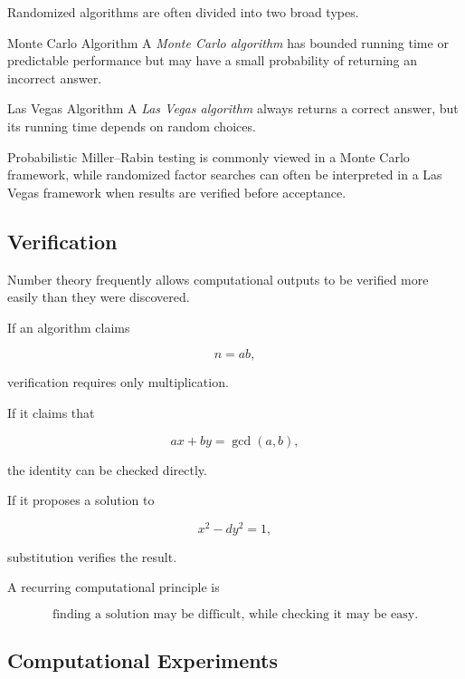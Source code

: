 Randomized algorithms are often divided into two broad types.

\begin{definitionbox}{Monte Carlo Algorithm}
A \emph{Monte Carlo algorithm} has bounded running time or predictable
performance but may have a small probability of returning an incorrect
answer.
\end{definitionbox}

\begin{definitionbox}{Las Vegas Algorithm}
A \emph{Las Vegas algorithm} always returns a correct answer, but its running
time depends on random choices.
\end{definitionbox}

Probabilistic Miller--Rabin testing is commonly viewed in a Monte Carlo
framework, while randomized factor searches can often be interpreted in a
Las Vegas framework when results are verified before acceptance.

\subsection{Verification}
\label{subsec:number-theoretic-verification}

Number theory frequently allows computational outputs to be verified more
easily than they were discovered.

If an algorithm claims

\[ n=ab, \]

verification requires only multiplication.

If it claims that

\[ ax+by=\gcd(a,b), \]

the identity can be checked directly.

If it proposes a solution to

\[ x^2-dy^2=1, \]

substitution verifies the result.

\begin{conceptbox}
A recurring computational principle is

\[
\boxed{
\text{finding a solution may be difficult, while checking it may be easy}.
}
\]
\end{conceptbox}

\subsection{Computational Experiments}
\label{subsec:number-theory-computational-experiments}

